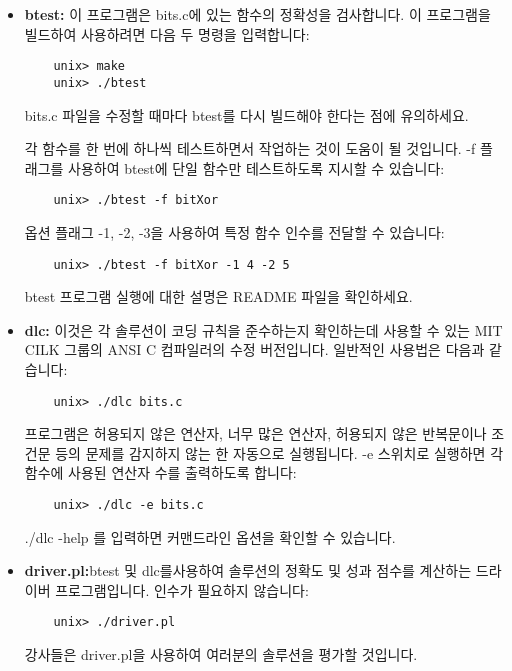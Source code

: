 \documentclass{article}
\begin{document}
\begin{itemize}
  \item \textbf{btest:} 이 프로그램은 bits.c에 있는 함수의 정확성을 검사합니다. 이 프로그램을 빌드하여 사용하려면 다음 두 명령을 입력합니다:
\begin{verbatim}
    unix> make
    unix> ./btest
\end{verbatim}

\noindent
bits.c 파일을 수정할 때마다 btest를 다시 빌드해야 한다는 점에 유의하세요.

\noindent
각 함수를 한 번에 하나씩 테스트하면서 작업하는 것이 도움이 될 것입니다. -f 플래그를 사용하여 btest에 단일 함수만 테스트하도록 지시할 수 있습니다:
\begin{verbatim}
    unix> ./btest -f bitXor
\end{verbatim}
\noindent
옵션 플래그 -1, -2, -3을 사용하여 특정 함수 인수를 전달할 수 있습니다: 
\begin{verbatim}
    unix> ./btest -f bitXor -1 4 -2 5
\end{verbatim}

\noindent
btest 프로그램 실행에 대한 설명은 README 파일을 확인하세요.

  \item \textbf{dlc:} 이것은 각 솔루션이 코딩 규칙을 준수하는지 확인하는데 사용할 수 있는 MIT CILK 그룹의 ANSI C 컴파일러의 수정 버전입니다. 일반적인 사용법은 다음과 같습니다:
\begin{verbatim}
    unix> ./dlc bits.c
\end{verbatim}

\noindent
프로그램은 허용되지 않은 연산자, 너무 많은 연산자, 허용되지 않은 반복문이나 조건문 등의 문제를 감지하지 않는 한 자동으로 실행됩니다. -e 스위치로 실행하면 각 함수에 사용된 연산자 수를 출력하도록 합니다:
\begin{verbatim}
    unix> ./dlc -e bits.c
\end{verbatim}

\noindent
./dlc -help 를 입력하면 커맨드라인 옵션을 확인할 수 있습니다. 

  \item \textbf{driver.pl:}btest 및 dlc를사용하여 솔루션의 정확도 및 성과 점수를 계산하는 드라이버 프로그램입니다. 인수가 필요하지 않습니다:
\begin{verbatim}
    unix> ./driver.pl
\end{verbatim}
\noindent
강사들은 driver.pl을 사용하여 여러분의 솔루션을 평가할 것입니다. 

\end{itemize}
\end{document}
